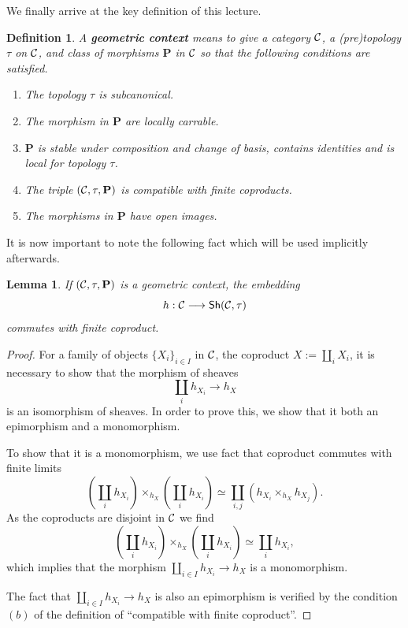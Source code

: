 \documentclass{tufte-book} %
\numberwithin{dummy}{section}
\newtheorem{lemma}[thm]{Lemma}
\newtheorem{dfn}[thm]{Definition}
\newcommand{\calc}{{\cal C}}
\newcommand{\lrta}{\longrightarrow}
\newcommand{\ssh}{\mathsf{Sh}}
\newcommand{\bfp}{\mathbf{P}}
\begin{document}
We finally arrive at the key definition of this lecture.
\begin{dfn}\label{dfn:geometric_context}
A \textbf{geometric context} means to give a category $\calc$, a (pre)topology $\tau$ on $\calc$, and class of morphisms $\bfp$ in $\calc$ so that the following conditions are satisfied.
\begin{enumerate}
\item The topology $\tau$ is subcanonical.
\item The morphism in $\bfp$ are locally carrable.
\item $\bfp$ is stable under composition and change of basis, contains identities and is local for topology $\tau$.
\item The triple $(\calc,\tau,\bfp)$ is compatible with finite coproducts.
\item The morphisms in $\bfp$ have open images.
  \end{enumerate}
\end{dfn}
It is now important to note the following fact which will be used implicitly afterwards.
\begin{lemma}
If $(\calc,\tau,\bfp)$ is a geometric context, the embedding 
$$
h:\calc\lrta \ssh(\calc,\tau)
$$
commutes with finite coproduct.
\end{lemma}
\begin{proof}
For a family of objects $\{X_i\}_{i\in I}$ in $\calc$, the coproduct $X:=\coprod_i X_i$, it is necessary to show that the morphism of sheaves
$$
\coprod_i h_{X_i}\lrta h_X
$$
is an isomorphism of sheaves. In order to prove this, we show that it both an epimorphism and a monomorphism.

To show that it is a monomorphism, we use fact that coproduct commutes with finite limits 
$$
\left(\coprod_i h_{X_i}\right)\times_{h_X}\left(\coprod_i h_{X_i}\right)\simeq \coprod_{i,j}(h_{X_i}\times_{h_X}h_{X_j}).
$$
As the coproducts are disjoint in $\calc$ we find
$$
\left(\coprod_i h_{X_i}\right)\times_{h_X}\left(\coprod_i h_{X_i}\right)\simeq \coprod_i h_{X_i},
$$
which implies that the morphism $\coprod_{i\in I} h_{X_i}\lrta h_X$ is a monomorphism.

The fact that $\coprod_{i\in I} h_{X_i}\lrta h_X$ is also an epimorphism is verified by the condition $(b)$ of the definition of ``compatible with finite coproduct''.
\end{proof}
\end{document}
